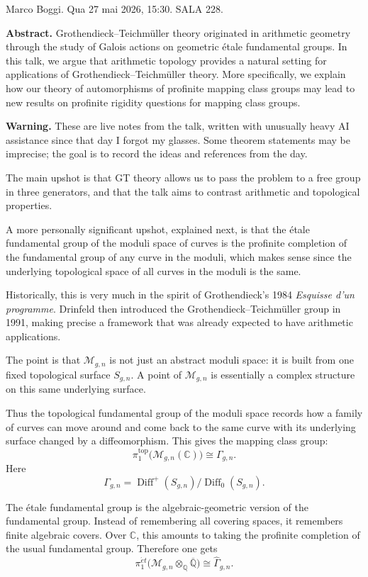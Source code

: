 \noindent
Marco Boggi.
Qua 27 mai 2026, 15:30.
SALA 228.

\medskip\noindent
{\bf Abstract.}
Grothendieck--Teichm\"uller theory originated
in arithmetic geometry through the study of
Galois actions on geometric \'etale
fundamental groups. In this talk, we argue
that arithmetic topology provides a natural
setting for applications of
Grothendieck--Teichm\"uller theory. More
specifically, we explain how our theory of
automorphisms of profinite mapping class
groups may lead to new results on profinite
rigidity questions for mapping class groups.

\medskip\noindent
{\bf Warning.}
These are live notes from the talk,
written with unusually heavy AI assistance
since that day I forgot my glasses.
Some theorem
statements may be imprecise; the goal is to
record the ideas and references from the day.\medskip\noindent

\medskip\noindent
The main upshot is that GT theory allows us
to pass the problem to a free group in three
generators, and that the talk aims to
contrast arithmetic and topological
properties.

A more personally significant 
upshot, explained next,
is that the étale fundamental
group of the moduli space of curves
is the profinite completion of
the fundamental group of any curve in 
the moduli, which makes sense since the
underlying topological space of all curves
in the moduli is the same.

\medskip\noindent
Historically, this is very much in the spirit
of Grothendieck's 1984 \emph{Esquisse d'un
programme}. Drinfeld then introduced the
Grothendieck--Teichm\"uller group in 1991,
making precise a framework that was already
expected to have arithmetic applications.

\medskip\noindent
The point is that $\mathcal M_{g,n}$ is
not just an abstract moduli space: it is
built from one fixed topological surface
$S_{g,n}$. A point of $\mathcal M_{g,n}$
is essentially a complex structure on this
same underlying surface.

\medskip\noindent
Thus the topological fundamental group of
the moduli space records how a family of
curves can move around and come back to the
same curve with its underlying surface
changed by a diffeomorphism. This gives the
mapping class group:
$$
\pi_1^{\mathrm{top}}
\bigl(\mathcal M_{g,n}(\mathbb C)\bigr)
\cong
\Gamma_{g,n}.
$$
Here
$$
\Gamma_{g,n}
=
\operatorname{Diff}^+(S_{g,n})/
\operatorname{Diff}_0(S_{g,n}).
$$

\medskip\noindent
The \'etale fundamental group is the
algebraic-geometric version of the
fundamental group. Instead of remembering
all covering spaces, it remembers finite
algebraic covers. Over $\mathbb C$, this
amounts to taking the profinite completion
of the usual fundamental group. Therefore
one gets
$$
\pi_1^{\acute{e}t}
\bigl(\mathcal M_{g,n}
\otimes_{\mathbb Q}\overline{\mathbb Q}\bigr)
\cong
\widehat{\Gamma}_{g,n}.
$$

